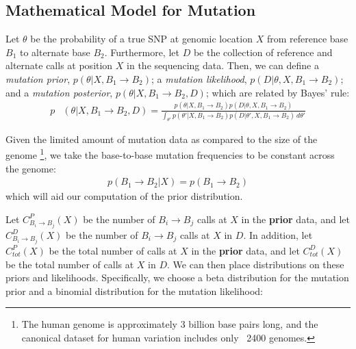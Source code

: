 \documentclass[10pt,letterpaper]{article}
\begin{document}
\subsection{Mathematical Model for Mutation}

\par Let $\theta$ be the probability of a true SNP at genomic location $X$ from reference base $B_1$ to alternate base $B_2$. Furthermore, let $D$ be the collection of reference and alternate calls at position
$X$ in the sequencing data. Then, we can define a \textit{mutation prior}, $p(\theta | X, B_1 \rightarrow B_2)$; a \textit{mutation likelihood}, $p(D | \theta, X, B_1 \rightarrow B_2)$; and a
\textit{mutation posterior}, $p(\theta | X, B_1 \rightarrow B_2, D)$; which are related by Bayes' rule:
\begin{equation}
\begin{aligned}
p &(\theta | X, B_1 \rightarrow B_2, D)  = \frac{ p(\theta | X, B_1 \rightarrow B_2) p(D | \theta, X, B_1 \rightarrow B_2) }{ \int_{\theta'} p(\theta' | X, B_1 \rightarrow B_2) p(D | \theta', X, B_1 \rightarrow B_2) \ d\theta'}
\end{aligned}
\end{equation}

Given the limited amount of mutation data as compared to the size of the genome \footnote{The human genome is approximately 3 billion base pairs long, and the canonical dataset for human variation includes only ~2400 genomes.},
we take the base-to-base mutation frequencies to be constant across the genome:
\begin{equation}
\begin{aligned}
p(B_1 \rightarrow B_2 | X) = p(B_1 \rightarrow B_2)
\end{aligned}
\end{equation}
which will aid our computation of the prior distribution.

\par Let $C^P_{B_i \rightarrow B_j}(X)$ be the number of $B_i \rightarrow B_j$ calls at $X$ in the \textbf{prior} data, and let $C^D_{B_i \rightarrow B_j}(X)$ be the number of $B_i \rightarrow B_j$ calls at $X$ in $D$.
In addition, let $C^P_{tot}(X)$ be the total number of calls at $X$ in the \textbf{prior} data, and let $C^D_{tot}(X)$ be the total number of calls at $X$ in $D$.
We can then place distributions on these priors and likelihoods. Specifically, we choose a beta distribution for the mutation prior and a binomial distribution for the mutation likelihood:
\end{document}

